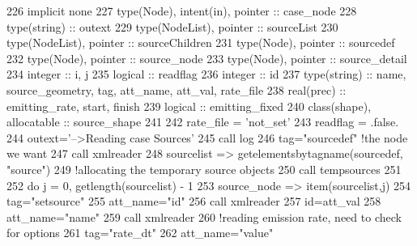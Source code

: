\begin{DoxyCode}
226     \textcolor{keywordtype}{implicit none}
227     \textcolor{keywordtype}{type}(Node), \textcolor{keywordtype}{intent(in)}, \textcolor{keywordtype}{pointer} :: case\_node
228     \textcolor{keywordtype}{type}(string) :: outext
229     \textcolor{keywordtype}{type}(NodeList), \textcolor{keywordtype}{pointer} :: sourceList
230     \textcolor{keywordtype}{type}(NodeList), \textcolor{keywordtype}{pointer} :: sourceChildren
231     \textcolor{keywordtype}{type}(Node), \textcolor{keywordtype}{pointer} :: sourcedef
232     \textcolor{keywordtype}{type}(Node), \textcolor{keywordtype}{pointer} :: source\_node
233     \textcolor{keywordtype}{type}(Node), \textcolor{keywordtype}{pointer} :: source\_detail
234     \textcolor{keywordtype}{integer} :: i, j
235     \textcolor{keywordtype}{logical} :: readflag
236     \textcolor{keywordtype}{integer} :: id
237     \textcolor{keywordtype}{type}(string) :: name, source\_geometry, tag, att\_name, att\_val, rate\_file
238     \textcolor{keywordtype}{real(prec)} :: emitting\_rate, start, finish
239     \textcolor{keywordtype}{logical} :: emitting\_fixed
240     \textcolor{keywordtype}{class}(shape), \textcolor{keywordtype}{allocatable} :: source\_shape
241 
242     rate\_file = \textcolor{stringliteral}{'not\_set'}
243     readflag = .false.
244     outext=\textcolor{stringliteral}{'-->Reading case Sources'}
245     \textcolor{keyword}{call }log%
246     tag=\textcolor{stringliteral}{"sourcedef"}    \textcolor{comment}{!the node we want}
247     \textcolor{keyword}{call }xmlreader%
248     sourcelist => getelementsbytagname(sourcedef, \textcolor{stringliteral}{"source"})
249     \textcolor{comment}{!allocating the temporary source objects}
250     \textcolor{keyword}{call }tempsources%
251 
252     \textcolor{keywordflow}{do} j = 0, getlength(sourcelist) - 1
253         source\_node => item(sourcelist,j)
254         tag=\textcolor{stringliteral}{"setsource"}
255         att\_name=\textcolor{stringliteral}{"id"}
256         \textcolor{keyword}{call }xmlreader%
257         id=att\_val%
258         att\_name=\textcolor{stringliteral}{"name"}
259         \textcolor{keyword}{call }xmlreader%
260         \textcolor{comment}{!reading emission rate, need to check for options}
261         tag=\textcolor{stringliteral}{"rate\_dt"}
262         att\_name=\textcolor{stringliteral}{"value"}

\end{DoxyCode}
